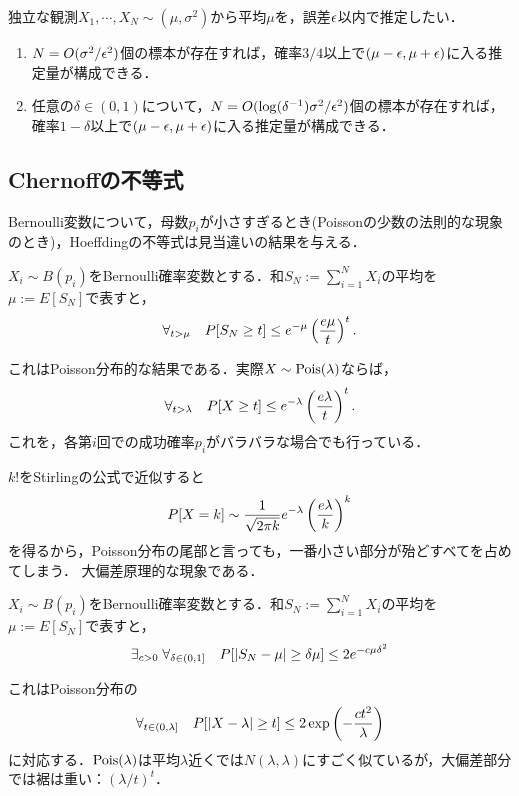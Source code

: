 \documentclass[uplatex,dvipdfmx]{jsreport}
\begin{document}
\begin{application}[平均の頑健推定]
    独立な観測$X_1,\cdots,X_N\sim(\mu,\sigma^2)$から平均$\mu$を，誤差$\epsilon$以内で推定したい．
    \begin{enumerate}
        \item $N=O(\sigma^2/\epsilon^2)$個の標本が存在すれば，確率$3/4$以上で$(\mu-\epsilon,\mu+\epsilon)$に入る推定量が構成できる．
        \item 任意の$\delta\in(0,1)$について，$N=O(\log(\delta^{-1})\sigma^2/\epsilon^2)$個の標本が存在すれば，確率$1-\delta$以上で$(\mu-\epsilon,\mu+\epsilon)$に入る推定量が構成できる．
    \end{enumerate}
\end{application}

\subsection{Chernoffの不等式}

\begin{tcolorbox}[colframe=ForestGreen, colback=ForestGreen!10!white,breakable,colbacktitle=ForestGreen!40!white,coltitle=black,fonttitle=\bfseries\sffamily,
title=]
    Bernoulli変数について，母数$p_i$が小さすぎるとき(Poissonの少数の法則的な現象のとき)，Hoeffdingの不等式は見当違いの結果を与える．
\end{tcolorbox}

\begin{theorem}
    $X_i\sim B(p_i)$をBernoulli確率変数とする．和$S_N:=\sum_{i=1}^NX_i$の平均を$\mu:=E[S_N]$で表すと，
    \[\forall_{t>\mu}\quad P[S_N\ge t]\le e^{-\mu}\left(\frac{e\mu}{t}\right)^t.\]
\end{theorem}
\begin{remarks}
    これはPoisson分布的な結果である．実際$X\sim\mathrm{Pois}(\lambda)$ならば，
    \[\forall_{t>\lambda}\quad P[X\ge t]\le e^{-\lambda}\left(\frac{e\lambda}{t}\right)^t.\]
    これを，各第$i$回での成功確率$p_i$がバラバラな場合でも行っている．
\end{remarks}

\begin{remark}[Poisson尾部の観察]
    $k!$をStirlingの公式で近似すると
    \[P[X=k]\sim\frac{1}{\sqrt{2\pi k}}e^{-\lambda}\left(\frac{e\lambda}{k}\right)^k\]
    を得るから，Poisson分布の尾部と言っても，一番小さい部分が殆どすべてを占めてしまう．
    大偏差原理的な現象である．
\end{remark}

\begin{theorem}[小偏差の場合]
    $X_i\sim B(p_i)$をBernoulli確率変数とする．和$S_N:=\sum_{i=1}^NX_i$の平均を$\mu:=E[S_N]$で表すと，
    \[\exists_{c>0}\;\forall_{\delta\in(0,1]}\quad P[\lvert S_N-\mu\rvert\ge\delta\mu]\le 2e^{-c\mu\delta^2}\]
\end{theorem}
\begin{remarks}
    これはPoisson分布の
    \[\forall_{t\in(0,\lambda]}\quad P[\lvert X-\lambda\rvert\ge t]\le 2\exp\left(-\frac{ct^2}{\lambda}\right)\]
    に対応する．$\mathrm{Pois}(\lambda)$は平均$\lambda$近くでは$N(\lambda,\lambda)$にすごく似ているが，大偏差部分では裾は重い：$(\lambda/t)^t$．
\end{remarks}
\end{document}
